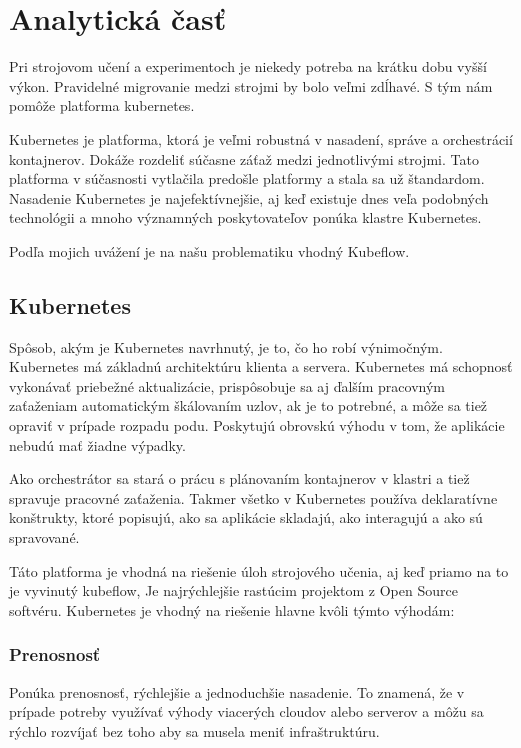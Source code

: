 
\chapter{Analytická časť}
Pri strojovom učení a experimentoch je niekedy potreba na krátku dobu vyšší výkon. Pravidelné migrovanie medzi strojmi by bolo veľmi zdĺhavé. S tým nám pomôže platforma kubernetes.

Kubernetes je platforma, ktorá je veľmi robustná v nasadení, správe a orchestrácií kontajnerov. Dokáže rozdeliť súčasne záťaž medzi jednotlivými strojmi. Tato platforma v súčasnosti vytlačila predošle platformy a stala sa už štandardom. Nasadenie Kubernetes je najefektívnejšie, aj keď existuje dnes veľa podobných technológii a mnoho významných poskytovateľov ponúka klastre Kubernetes.

Podľa mojich uvážení je na našu problematiku vhodný Kubeflow.

\section{Kubernetes}
Spôsob, akým je Kubernetes navrhnutý, je to, čo ho robí výnimočným. Kubernetes má základnú architektúru klienta a servera. Kubernetes má schopnosť vykonávať priebežné aktualizácie, prispôsobuje sa aj ďalším pracovným zaťaženiam automatickým škálovaním uzlov, ak je to potrebné, a môže sa tiež opraviť v prípade rozpadu podu. Poskytujú obrovskú výhodu v tom, že aplikácie nebudú mať žiadne výpadky.

Ako orchestrátor sa stará o prácu s plánovaním kontajnerov v klastri a tiež spravuje pracovné zaťaženia. Takmer všetko v Kubernetes používa deklaratívne konštrukty, ktoré popisujú, ako sa aplikácie skladajú, ako interagujú a ako sú spravované.

Táto platforma je vhodná na riešenie úloh strojového učenia, aj keď priamo na to je vyvinutý kubeflow, Je najrýchlejšie rastúcim projektom z Open Source softvéru. Kubernetes je vhodný na riešenie hlavne kvôli týmto výhodám:

\subsection*{Prenosnosť}
Ponúka prenosnosť, rýchlejšie a jednoduchšie nasadenie. To znamená, že v prípade potreby využívať výhody viacerých cloudov alebo serverov a môžu sa rýchlo rozvíjať bez toho aby sa musela meniť infraštruktúru.

